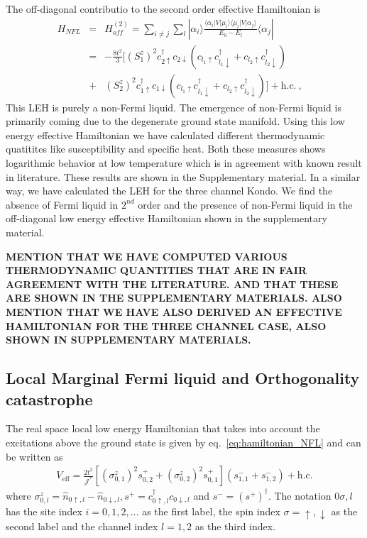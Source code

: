 \documentclass[reprint,prb,superscriptaddress]{revtex4-1}
\begin{document}
The off-diagonal contributio to the second order effective Hamiltonian is 
\begin{eqnarray}
H_{NFL}&=&H^{(2)}_{off} = \sum_{i\neq j} \sum_l |\alpha_i\rangle \frac{\langle \alpha_i  | V| \mu_l \rangle \langle \mu_l  | V| \alpha_j \rangle}{E_0-E_{l}}\langle \alpha_j | \nonumber\\
&=& -\frac{8t^2}{3} [ (S_1^z)^2 c_{2\uparrow}^{\dagger}c_{2\downarrow}  (  c_{l_1\uparrow}c_{l_1\downarrow}^{\dagger} +  c_{l_2\uparrow}c_{l_2\downarrow}^{\dagger}  ) \nonumber\\
&+& (S_2^z)^2 c_{1\uparrow}^{\dagger}c_{1\downarrow}  (  c_{l_1\uparrow}c_{l_1\downarrow}^{\dagger} +  c_{l_2\uparrow}c_{l_2\downarrow}^{\dagger}  ) ] + \textrm{h.c.} ~,~~~~
\label{eq:hamiltonian_NFL}
\end{eqnarray}
This LEH is purely a non-Fermi liquid. The emergence of non-Fermi liquid is primarily coming due to the degenerate ground state manifold. Using this low energy effective Hamiltonian we have calculated different thermodynamic quatitites like susceptibility and specific heat. Both these measures shows logarithmic behavior at low temperature which is in agreement with known result in literature. These results are shown in the Supplementary material. In a similar way, we have calculated the LEH for the three channel Kondo. We find the absence of Fermi liquid in $2^{nd}$ order and the presence of non-Fermi liquid in the off-diagonal low energy effective Hamiltonian shown in the supplementary material.

\textbf{MENTION THAT WE HAVE COMPUTED VARIOUS THERMODYNAMIC QUANTITIES THAT ARE IN FAIR AGREEMENT WITH THE LITERATURE. AND THAT THESE ARE SHOWN IN THE SUPPLEMENTARY MATERIALS. ALSO MENTION THAT WE HAVE ALSO DERIVED AN EFFECTIVE HAMILTONIAN FOR THE THREE CHANNEL CASE, ALSO SHOWN IN SUPPLEMENTARY MATERIALS.}


\subsection{Local Marginal Fermi liquid and Orthogonality catastrophe}
\label{sec:MFL}

The real space local low energy Hamiltonian that takes into account the excitations above the ground state is given by eq.~\ref{eq:hamiltonian_NFL} and can be written as
\begin{equation}\begin{aligned}
	\label{nfl_terms}
	V_\text{eff} = \frac{2t^2}{{\mathcal{J}^*}}\left[\left(\sigma^z_{0,1}\right)^2 s^+_{0,2} + \left(\sigma^z_{0,2}\right)^2 s^+_{0,1}\right] \left(s^-_{1,1} + s^-_{1,2}\right) + \text{h.c.}
\end{aligned}\end{equation}
where \(\sigma^z_{0,l} = \hat n_{0\uparrow,l} - \hat n_{0\downarrow,l}, s^+ = c^\dagger_{0 \uparrow,l}c_{0 \downarrow,l}\) and \(s^- = \left(s^+\right)^\dagger\). The notation \(0\sigma,l\) has the site index \(i=0,1,2,\ldots\) as the first label, the spin index \(\sigma=\uparrow,\downarrow\) as the second label and the channel index \(l=1,2\) as the third index.
\end{document}
